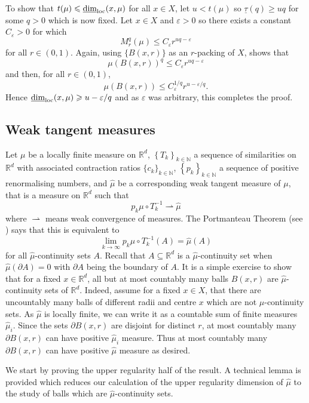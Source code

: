 To show that $t(\mu) \leqslant \underline{\dim}_{\textup{loc}}(x,\mu)$ for all $x \in X$, let $u < t(\mu)$ so $\underline{\tau}(q) \ge uq$ for some $q > 0$ which is now fixed. Let $ x \in X$ and $\varepsilon > 0$ so there exists a constant $C_{\varepsilon} > 0$ for which
\[
M_r^q(\mu) \le C_\varepsilon r^{uq - \varepsilon}
\]
for all $r \in (0,1)$. Again, using $\{B(x,r) \}$ as an $r$-packing of $X$, shows that
\[
\mu(B(x,r))^q \le C_\varepsilon r^{uq - \varepsilon}
\]
and then, for all $r \in (0,1)$,
\[
\mu(B(x,r)) \le C_\varepsilon^{1/q} r^{u-\varepsilon/q}.
\]
Hence $\underline{\dim}_{\textup{loc}}(x,\mu) \geqslant u -\varepsilon / q$ and as $\varepsilon$ was arbitrary, this completes the proof.




\subsection{Weak tangent measures} \label{ch-upper-reg:weaktangentsproof}

Let $\mu$ be a locally finite measure on $\mathbb{R}^d$, $\left\{T_k\right\}_{k\in \mathbb{N}}$ a sequence of similarities on $\mathbb{R}^d$ with associated contraction ratios $\{c_k\}_{k\in \mathbb{N}}$, $\left\{p_k\right\}_{k\in \mathbb{N}}$ a sequence of positive renormalising numbers, and $\hat{\mu}$ be a corresponding weak tangent measure of $\mu$, that is a measure on $\mathbb{R}^d$ such that 
\[
p_k \mu \circ T^{-1}_k \rightharpoonup \hat{\mu}
\]
where $\rightharpoonup$ means weak convergence of measures. The Portmanteau Theorem (see \cite[Theorem 1.24]{mattila}) says that this is equivalent to 
\[
\lim_{k\rightarrow \infty} p_k \mu \circ T^{-1}_k (A) =\hat{\mu}(A)
\]
for all $\hat{\mu}$-continuity sets $A$. Recall that  $A\subseteq \mathbb{R}^d$ is a $\hat{\mu}$-continuity set when $\hat{\mu}(\partial A) = 0$ with $\partial A$ being the boundary of $A$. It is a simple exercise to show that for a fixed $x \in \mathbb{R}^d$, all but at most countably many balls $B(x,r)$ are $\hat{\mu}$-continuity sets of $\mathbb{R}^d$. Indeed, assume for a fixed $x \in X$, that there are uncountably many balls of different radii and centre $x$ which are not $\hat{\mu}$-continuity sets. As $\hat{\mu}$ is locally finite, we can write it as a countable sum of finite measures $\hat{\mu}_i$. Since the sets $\partial B(x,r)$ are disjoint for distinct $r$, at most countably many $\partial B(x,r)$ can have positive $\hat{\mu}_i$ measure. Thus at most countably many $\partial B(x,r)$ can have positive $\hat{\mu}$ measure as desired.


We start by proving the upper regularity half of the result. A technical lemma is provided which reduces our calculation of the upper regularity dimension of $\hat \mu$ to the study of balls which are $\hat{\mu}$-continuity sets.

